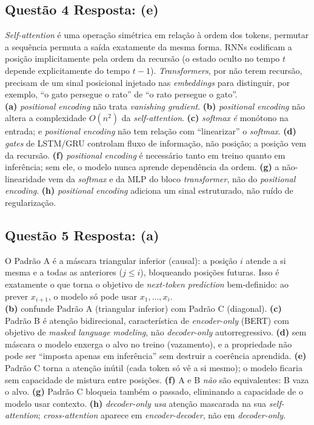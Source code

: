 \documentclass[11pt,a4paper]{article}
\begin{document}
\subsection*{Questão 4 \textemdash{} Resposta: (e)}
\textit{Self-attention} é uma operação simétrica em relação à ordem dos tokens, permutar a sequência permuta a saída exatamente da mesma forma. RNNs codificam a posição implicitamente pela ordem da recursão (o estado oculto no tempo $t$ depende explicitamente do tempo $t-1$). \textit{Transformers}, por não terem recursão, precisam de um sinal posicional injetado nas \textit{embeddings} para distinguir, por exemplo, ``o gato persegue o rato'' de ``o rato persegue o gato''.\\
\textbf{(a)} \textit{positional encoding} não trata \textit{vanishing gradient}.
\textbf{(b)} \textit{positional encoding} não altera a complexidade $O(n^2)$ da \textit{self-attention}.
\textbf{(c)} \textit{softmax} \emph{é} monótono na entrada; e \textit{positional encoding} não tem relação com ``linearizar'' o \textit{softmax}.
\textbf{(d)} \textit{gates} de LSTM/GRU controlam fluxo de informação, não posição; a posição vem da recursão.
\textbf{(f)} \textit{positional encoding} é necessário tanto em treino quanto em inferência; sem ele, o modelo nunca aprende dependência da ordem.
\textbf{(g)} a não-linearidade vem da \textit{softmax} e da MLP do bloco \textit{transformer}, não do \textit{positional encoding}.
\textbf{(h)} \textit{positional encoding} adiciona um sinal estruturado, não ruído de regularização.

\subsection*{Questão 5 \textemdash{} Resposta: (a)}
O Padrão A é a máscara triangular inferior (causal): a posição $i$ atende a si mesma e a todas as anteriores ($j \le i$), bloqueando posições futuras. Isso é exatamente o que torna o objetivo de \textit{next-token prediction} bem-definido: ao prever $x_{i+1}$, o modelo só pode usar $x_1, \ldots, x_i$.\\
\textbf{(b)} confunde Padrão A (triangular inferior) com Padrão C (diagonal).
\textbf{(c)} Padrão B é atenção bidirecional, característica de \textit{encoder-only} (BERT) com objetivo de \textit{masked language modeling}, não \textit{decoder-only} autorregressivo.
\textbf{(d)} sem máscara o modelo enxerga o alvo no treino (vazamento), e a propriedade não pode ser ``imposta apenas em inferência'' sem destruir a coerência aprendida.
\textbf{(e)} Padrão C torna a atenção inútil (cada token só vê a si mesmo); o modelo ficaria sem capacidade de mistura entre posições.
\textbf{(f)} A e B \emph{não} são equivalentes: B vaza o alvo.
\textbf{(g)} Padrão C bloqueia também o passado, eliminando a capacidade de o modelo usar contexto.
\textbf{(h)} \textit{decoder-only} \emph{usa} atenção mascarada na sua \textit{self-attention}; \textit{cross-attention} aparece em \textit{encoder-decoder}, não em \textit{decoder-only}.
\end{document}
